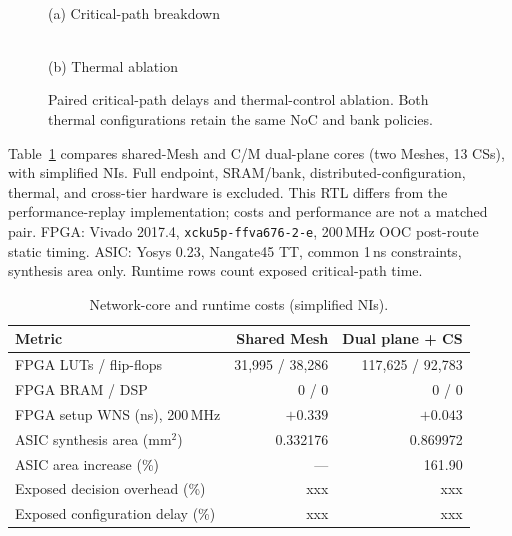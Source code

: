 \documentclass[conference,10pt]{IEEEtran}
\newcommand{\Description}[1]{}
\begin{document}
\begin{figure}[!t]
\centering
\begin{minipage}{0.47\columnwidth}\centering
\fbox{\rule{0pt}{16mm}\rule{0.88\linewidth}{0pt}}\\
{\fontsize{7}{8}\selectfont\rmfamily\mdseries\upshape (a) Critical-path breakdown}
\end{minipage}\hfill
\begin{minipage}{0.49\columnwidth}\centering
\fbox{\rule{0pt}{16mm}\rule{0.88\linewidth}{0pt}}\\
{\fontsize{7}{8}\selectfont\rmfamily\mdseries\upshape (b) Thermal ablation}
\end{minipage}
\caption{Paired critical-path delays and thermal-control ablation.
Both thermal configurations retain the same NoC and bank policies.}
\Description{Two placeholders for latency breakdown and thermal ablation.}
\label{fig:eval-breakdown}
\label{fig:eval-thermal}
\end{figure}

Table~\ref{tab:eval-cost} compares shared-Mesh and C/M dual-plane cores (two Meshes, 13 CSs), with simplified NIs. Full endpoint, SRAM/bank, distributed-configuration, thermal, and cross-tier hardware is excluded. This RTL differs from the performance-replay implementation; costs and performance are not a matched pair. FPGA: Vivado 2017.4, \texttt{xcku5p-}\allowbreak\texttt{ffva676-2-e}, 200\,MHz OOC post-route static timing. ASIC: Yosys 0.23, Nangate45 TT, common 1\,ns constraints, synthesis area only. Runtime rows count exposed critical-path time.

\begin{table}[!ht]
\caption{Network-core and runtime costs (simplified NIs).}
\label{tab:eval-cost}
\centering\scriptsize
\renewcommand{\arraystretch}{0.85}
\begin{tabularx}{\columnwidth}{@{}>{\raggedright\arraybackslash}Xrr@{}}
\hline
Metric & Shared Mesh & Dual plane + CS \\
\hline
FPGA LUTs / flip-flops & 31,995 / 38,286 & 117,625 / 92,783 \\
FPGA BRAM / DSP & 0 / 0 & 0 / 0 \\
FPGA setup WNS (ns), 200\,MHz & $+0.339$ & $+0.043$ \\
ASIC synthesis area (mm$^2$) & 0.332176 & 0.869972 \\
ASIC area increase (\%) & --- & 161.90 \\
\hline
Exposed decision overhead (\%) & xxx & xxx \\
Exposed configuration delay (\%) & xxx & xxx \\
\hline
\end{tabularx}
\end{table}
\end{document}
